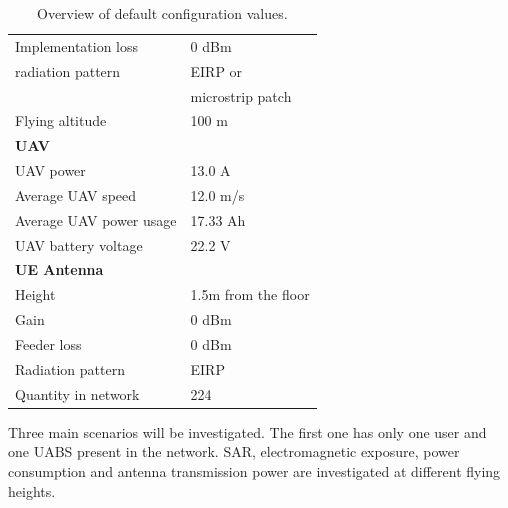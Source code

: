 \documentclass[twocolumn]{phdsymp} %
\begin{document}
\begin{table}[!htb]
\begin{tabular}[t]{ll}
        \hspace{3mm}  Implementation loss                 & 0 dBm   \\
        \hspace{3mm}  radiation pattern                   & EIRP or\\
         \hspace{3mm}                                     & microstrip patch\\
        \hspace{3mm}  Flying altitude                     & 100 m  \\
        \hline
        \multicolumn{2}{l}{\textbf{UAV}} \\
        \hline  
        \hspace{3mm}  UAV power                           & 13.0 A   \\
        \hspace{3mm}  Average UAV speed                   & 12.0 m/s \\
        \hspace{3mm}  Average UAV power usage             & 17.33 Ah    \\
        \hspace{3mm}  UAV battery voltage                 & 22.2 V \\
        \hline
        \multicolumn{2}{l}{\textbf{\acs{UE} Antenna}} \\
        \hline 
        \hspace{3mm} Height                     & 1.5m from the floor       \\ 
        \hspace{3mm} Gain                      & 0 dBm   \\ 
        \hspace{3mm} Feeder loss               & 0 dBm   \\ 
        \hspace{3mm} Radiation pattern         & \acs{EIRP}  \\
        \hspace{3mm} Quantity in network                & 224  \\
        \toprule
\end{tabular}
\caption{Overview of default configuration values.}
\label{table:defaultconf}
\end{table}
 
Three main scenarios will be investigated. 
The first one has only one user and one \gls{UABS} present in the network. 
SAR, electromagnetic exposure, power consumption 
and antenna transmission power are investigated at different flying heights.
\end{document}
